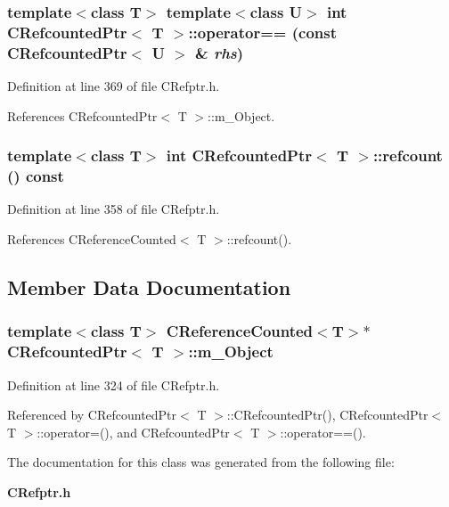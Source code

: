 \subsubsection{\setlength{\rightskip}{0pt plus 5cm}template$<$class T$>$ template$<$class U$>$ int CRefcounted\-Ptr$<$ T $>$::operator== (const CRefcounted\-Ptr$<$ U $>$ \& {\em rhs})\hspace{0.3cm}{\tt  [inline]}}\label{classCRefcountedPtr_a6}




Definition at line 369 of file CRefptr.h.

References CRefcounted\-Ptr$<$ T $>$::m\_\-Object.
\subsubsection{\setlength{\rightskip}{0pt plus 5cm}template$<$class T$>$ int CRefcounted\-Ptr$<$ T $>$::refcount () const\hspace{0.3cm}{\tt  [inline]}}\label{classCRefcountedPtr_a5}




Definition at line 358 of file CRefptr.h.

References CReference\-Counted$<$ T $>$::refcount().

\subsection{Member Data Documentation}
\subsubsection{\setlength{\rightskip}{0pt plus 5cm}template$<$class T$>$ {\bf CReference\-Counted}$<$T$>$$\ast$ CRefcounted\-Ptr$<$ T $>$::m\_\-Object\hspace{0.3cm}{\tt  [private]}}\label{classCRefcountedPtr_o0}




Definition at line 324 of file CRefptr.h.

Referenced by CRefcounted\-Ptr$<$ T $>$::CRefcounted\-Ptr(), CRefcounted\-Ptr$<$ T $>$::operator=(), and CRefcounted\-Ptr$<$ T $>$::operator==().

The documentation for this class was generated from the following file:\begin{CompactItemize}
\item 
{\bf CRefptr.h}\end{CompactItemize}
